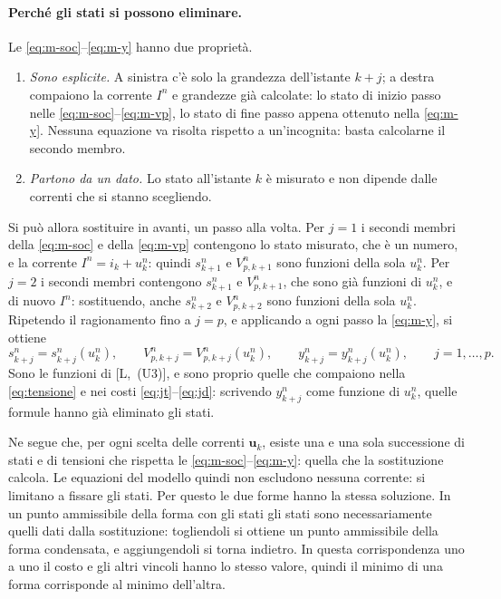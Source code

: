 \documentclass[11pt,a4paper]{article}
\newcommand{\vett}[1]{\boldsymbol{#1}}      %
\begin{document}
\paragraph{Perché gli stati si possono eliminare.} Le
\eqref{eq:m-soc}--\eqref{eq:m-y} hanno due proprietà.
\begin{enumerate}
  \item \emph{Sono esplicite.} A sinistra c'è solo la grandezza
        dell'istante $k+j$; a destra compaiono la corrente $I^n$ e grandezze
        già calcolate: lo stato di inizio passo nelle
        \eqref{eq:m-soc}--\eqref{eq:m-vp}, lo stato di fine passo appena
        ottenuto nella \eqref{eq:m-y}. Nessuna equazione va risolta rispetto
        a un'incognita: basta calcolarne il secondo membro.
  \item \emph{Partono da un dato.} Lo stato all'istante $k$ è misurato e non
        dipende dalle correnti che si stanno scegliendo.
\end{enumerate}
Si può allora sostituire in avanti, un passo alla volta. Per $j = 1$ i secondi
membri della \eqref{eq:m-soc} e della \eqref{eq:m-vp} contengono lo stato
misurato, che è un numero, e la corrente $I^n = i_k + u^n_k$: quindi
$s^n_{k+1}$ e $V^n_{p,k+1}$ sono funzioni della sola $u^n_k$. Per $j = 2$ i
secondi membri contengono $s^n_{k+1}$ e $V^n_{p,k+1}$, che sono già funzioni
di $u^n_k$, e di nuovo $I^n$: sostituendo, anche $s^n_{k+2}$ e $V^n_{p,k+2}$
sono funzioni della sola $u^n_k$. Ripetendo il ragionamento fino a $j = p$, e
applicando a ogni passo la \eqref{eq:m-y}, si ottiene
\[
  s^n_{k+j} = s^n_{k+j}(u^n_k) , \qquad
  V^n_{p,k+j} = V^n_{p,k+j}(u^n_k) , \qquad
  y^n_{k+j} = y^n_{k+j}(u^n_k) , \qquad j = 1, \dots, p .
\]
Sono le funzioni di [L,~(U3)], e sono proprio quelle che compaiono nella
\eqref{eq:tensione} e nei costi \eqref{eq:jt}--\eqref{eq:jd}: scrivendo
$y^n_{k+j}$ come funzione di $u^n_k$, quelle formule hanno già eliminato gli
stati.

Ne segue che, per ogni scelta delle correnti $\vett{u}_k$, esiste una e una sola
successione di stati e di tensioni che rispetta le
\eqref{eq:m-soc}--\eqref{eq:m-y}: quella che la sostituzione calcola. Le
equazioni del modello quindi non escludono nessuna corrente: si limitano a
fissare gli stati. Per questo le due forme hanno la stessa soluzione. In un
punto ammissibile della forma con gli stati gli stati sono necessariamente
quelli dati dalla sostituzione: togliendoli si ottiene un punto ammissibile
della forma condensata, e aggiungendoli si torna indietro. In questa
corrispondenza uno a uno il costo e gli altri vincoli hanno lo stesso valore,
quindi il minimo di una forma corrisponde al minimo dell'altra.
\end{document}
